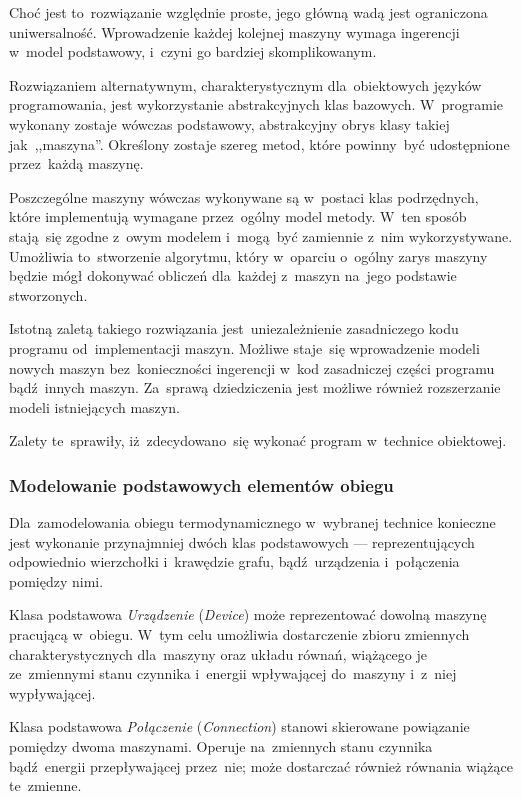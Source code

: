 Choć jest to~rozwiązanie względnie proste, jego główną wadą jest
ograniczona uniwersalność. Wprowadzenie każdej kolejnej maszyny wymaga
ingerencji w~model podstawowy, i~czyni go bardziej skomplikowanym.

Rozwiązaniem alternatywnym, charakterystycznym dla~obiektowych języków
programowania, jest wykorzystanie abstrakcyjnych klas bazowych.
W~programie wykonany zostaje wówczas podstawowy, abstrakcyjny obrys
klasy takiej jak~,,maszyna''. Określony zostaje szereg metod, które
powinny~być udostępnione przez~każdą maszynę.

Poszczególne maszyny wówczas wykonywane są w~postaci klas podrzędnych,
które implementują wymagane przez~ogólny model metody. W~ten sposób
stają~się zgodne z~owym modelem i~mogą~być zamiennie z~nim
wykorzystywane. Umożliwia to~stworzenie algorytmu, który w~oparciu
o~ogólny zarys maszyny będzie mógł dokonywać obliczeń dla~każdej
z~maszyn na~jego podstawie stworzonych.

Istotną zaletą takiego rozwiązania jest~uniezależnienie zasadniczego
kodu programu od~implementacji maszyn. Możliwe staje~się wprowadzenie
modeli nowych maszyn bez~konieczności ingerencji w~kod zasadniczej
części programu bądź~innych maszyn. Za~sprawą dziedziczenia jest możliwe
również rozszerzanie modeli istniejących maszyn.

Zalety te~sprawiły, iż~zdecydowano~się wykonać program w~technice
obiektowej.


\subsubsection{Modelowanie podstawowych elementów obiegu}

Dla~zamodelowania obiegu termodynamicznego w~wybranej technice
konieczne jest wykonanie przynajmniej dwóch klas podstawowych ---
reprezentujących odpowiednio wierzchołki i~krawędzie grafu,
bądź~urządzenia i~połączenia pomiędzy nimi.

Klasa podstawowa \textit{Urządzenie} (\textit{Device}) może
reprezentować dowolną maszynę pracującą w~obiegu. W~tym celu umożliwia
dostarczenie zbioru zmiennych charakterystycznych dla~maszyny oraz
układu równań, wiążącego je ze~zmiennymi stanu czynnika i~energii
wpływającej do~maszyny i~z~niej wypływającej.

Klasa podstawowa \textit{Połączenie} (\textit{Connection}) stanowi
skierowane powiązanie pomiędzy dwoma maszynami. Operuje na~zmiennych
stanu czynnika bądź~energii przepływającej przez~nie; może dostarczać
również równania wiążące te~zmienne.

